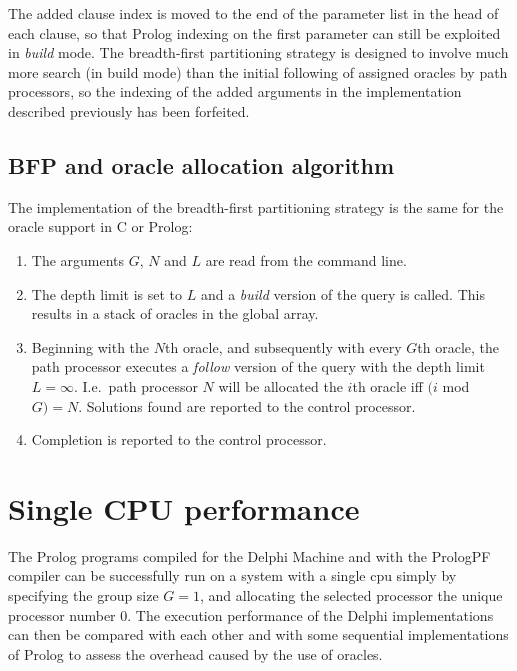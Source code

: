 The added clause index is moved to the end of the parameter list in the head of each clause, so that
Prolog indexing on the first parameter can still be exploited in \textit{build} mode.  The
breadth-first partitioning strategy is designed to involve much more search (in build mode) than the
initial following of assigned oracles by path processors, so the indexing of the added arguments 
in the implementation described previously has been
forfeited.

\subsection{BFP and oracle allocation algorithm}
\label{oracle_alloc}

The implementation of the breadth-first partitioning strategy is the same for
the oracle support in C or Prolog:
\begin{enumerate}
\item{The arguments $G$, $N$ and $L$ are read from the command line.}
\item{The depth limit is set to $L$ and a \textit{build} version of the
  query is called.  This results in a stack of oracles in the global array.}
\item{Beginning with the $N$th oracle, and subsequently with every $G$th
  oracle, the path processor executes a \textit{follow} version of the
  query with the depth limit $L=\infty$. 
  I.e.~path processor $N$ will be allocated the $i$th oracle
  iff $(i$ mod $G) = N$. Solutions found are reported to
  the control processor.}
\item{Completion is reported to the control processor.}
\end{enumerate}

\section{Single CPU performance} %

The Prolog programs compiled for the Delphi Machine and with the PrologPF
compiler can be successfully run on a system with a single cpu simply by
specifying the group size $G=1$, and allocating the selected processor the
unique processor number $0$.  The execution performance of the Delphi
implementations can then be compared with each other and with some
sequential implementations of Prolog to assess the overhead caused by the
use of oracles.

